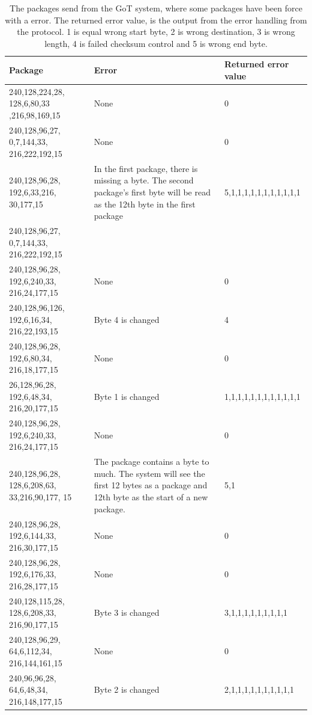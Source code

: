 \begin{table}[H]
\centering
\begin{tabular}{|p{3cm}|p{8cm}|p{4cm}|}
\hline
Package & Error & Returned error value \\
\hline
240,128,224,28, 128,6,80,33 ,216,98,169,15 & None & 0 \\
\hline
240,128,96,27, 0,7,144,33, 216,222,192,15 & None & 0 \\
\hline
240,128,96,28, 192,6,33,216, 30,177,15 & In the first package, there is missing a byte. The second package's first byte will be read as the 12th byte in the first package & 5,1,1,1,1,1,1,1,1,1,1,1 \\
\cline{1-1}
240,128,96,27, 0,7,144,33, 216,222,192,15 & & \\
\hline
240,128,96,28, 192,6,240,33, 216,24,177,15 & None & 0 \\
\hline
240,128,96,126, 192,6,16,34, 216,22,193,15 & Byte 4 is changed & 4 \\
\hline
240,128,96,28, 192,6,80,34, 216,18,177,15 & None & 0 \\
\hline
26,128,96,28, 192,6,48,34, 216,20,177,15 & Byte 1 is changed & 1,1,1,1,1,1,1,1,1,1,1,1 \\
\hline
240,128,96,28, 192,6,240,33, 216,24,177,15 & None & 0 \\
\hline
240,128,96,28, 128,6,208,63, 33,216,90,177, 15 & The package contains a byte to much. The system will see the first 12 bytes as a package and 12th byte as the start of a new package. & 5,1 \\
\hline
240,128,96,28, 192,6,144,33, 216,30,177,15 & None & 0 \\
\hline
240,128,96,28, 192,6,176,33, 216,28,177,15 & None & 0 \\
\hline
240,128,115,28, 128,6,208,33, 216,90,177,15 & Byte 3 is changed & 3,1,1,1,1,1,1,1,1,1 \\
\hline
240,128,96,29, 64,6,112,34, 216,144,161,15 & None & 0 \\
\hline
240,96,96,28, 64,6,48,34, 216,148,177,15 & Byte 2 is changed & 2,1,1,1,1,1,1,1,1,1,1 \\
\hline
\end{tabular}
\label{AccT2tab}
\caption{The packages send from the GoT system, where some packages have been force with a error. The returned error value, is the output from the error handling from the protocol. 1 is equal wrong start byte, 2 is wrong destination, 3 is wrong length, 4 is failed checksum control and 5 is wrong end byte.}
\end{table}

